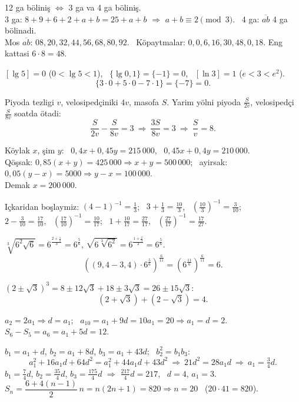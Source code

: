 




12 ga böliniş $\iff$ 3 ga va 4 ga böliniş.\\
3 ga: $8+9+6+2+a+b=25+a+b$ $\Rightarrow$ $a+b\equiv2\pmod3$. \ 4 ga: $\overline{ab}$ 4 ga bölinadi.\\
Mos $\overline{ab}$: $08,20,32,44,56,68,80,92$. \ Köpaytmalar: $0,0,6,16,30,48,0,18$. Eng kattasi $6\cdot8=48$.

$[\lg5]=0$ ($0<\lg5<1$), \ $\{\lg0{,}1\}=\{-1\}=0$, \ $[\ln3]=1$ ($e<3<e^2$).
\[\{3\cdot0+5\cdot0-7\cdot1\}=\{-7\}=0.\]

Piyoda tezligi $v$, velosipedçiniki $4v$, masofa $S$. Yarim yölni piyoda $\frac S{2v}$, velosipedçi $\frac S{8v}$ soatda ötadi:
\[\frac S{2v}-\frac S{8v}=3\ \Rightarrow\ \frac{3S}{8v}=3\ \Rightarrow\ \frac Sv=8.\]

Köylak $x$, şim $y$: \ $0{,}4x+0{,}45y=215\,000$, \ $0{,}45x+0{,}4y=210\,000$.\\
Qöşsak: $0{,}85(x+y)=425\,000\Rightarrow x+y=500\,000$; \ ayirsak: $0{,}05(y-x)=5000\Rightarrow y-x=100\,000$.\\
Demak $x=200\,000$.

Içkaridan boşlaymiz: $(4-1)^{-1}=\frac13$; \ $3+\frac13=\frac{10}3$, \ $\left(\frac{10}3\right)^{-1}=\frac3{10}$;\\
$2-\frac3{10}=\frac{17}{10}$, \ $\left(\frac{17}{10}\right)^{-1}=\frac{10}{17}$; \ $1+\frac{10}{17}=\frac{27}{17}$, \ $\left(\frac{27}{17}\right)^{-1}=\frac{17}{27}$.

$\sqrt[3]{6^2\sqrt6}=6^{\frac{2+\frac12}3}=6^{\frac56}$, \quad $\sqrt{6\sqrt[3]{6^2}}=6^{\frac{1+\frac23}2}=6^{\frac56}$.
\[\left((9{,}4-3{,}4)\cdot6^{\frac56}\right)^{\frac6{11}}=\left(6^{\frac{11}6}\right)^{\frac6{11}}=6.\]

$(2\pm\sqrt3)^3=8\pm12\sqrt3+18\pm3\sqrt3=26\pm15\sqrt3$:
\[(2+\sqrt3)+(2-\sqrt3)=4.\]

$a_2=2a_1\Rightarrow d=a_1$; \ $a_{10}=a_1+9d=10a_1=20\Rightarrow a_1=d=2$.\\
$S_6-S_5=a_6=a_1+5d=12$.

$b_1=a_1+d$, $b_2=a_1+8d$, $b_3=a_1+43d$; \ $b_2^2=b_1b_3$:
\[a_1^2+16a_1d+64d^2=a_1^2+44a_1d+43d^2\ \Rightarrow\ 21d^2=28a_1d\ \Rightarrow\ a_1=\tfrac34d.\]
$b_1=\frac74d$, $b_2=\frac{35}4d$, $b_3=\frac{175}4d$ $\Rightarrow$ $\frac{217}4d=217$, \ $d=4$, $a_1=3$.\\
$S_n=\dfrac{6+4(n-1)}2\,n=n(2n+1)=820\Rightarrow n=20$ \ ($20\cdot41=820$).

